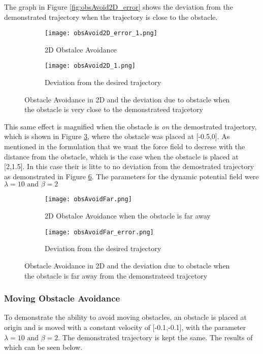 The graph in Figure \ref{fig:obsAvoid2D_error} shows the deviation from the demonstrated trajectory when the trajectory is close to the obstacle. 
\begin{figure}[!htp]
    \centering
    \begin{subfigure}{0.5\textwidth}
        \texttt{[image: obsAvoid2D\_error\_1.png]}
        \caption{2D Obstalce Avoidance}
        \label{fig:obsAvoid2D_1}
    \end{subfigure}%
    \begin{subfigure}{0.5\textwidth}
        \centering
        \texttt{[image: obsAvoid2D\_1.png]}
        \caption{Deviation from the desired trajectory}
        \label{fig:obsAvoid2D_error_1}
    \end{subfigure}
    \caption{Obstacle Avoidance in 2D and the deviation due to obstacle when the obstacle is very close to the demonstrateed trajcetory}
    \label{fig:obsAvoid2D_ontraj}
\end{figure}


This same effect is magnified when the obstacle is \textit{on} the demostrated trajectory, 
which is shown in Figure \ref{fig:obsAvoid2D_ontraj}, where
the obstacle was placed at [-0.5,0]. As mentioned in the formulation that we want the force field to decrese with the distance from the obstacle, which
is the case when the obstacle is placed at [2,1.5]. In this case their is litte to no deviation from the demostrated trajectory
as demonstrated in Figure \ref{fig:obsAvoid2Dfar}. The parameters for the dynamic potential field were $\lambda = 10 \text{ and } \beta = 2$
\begin{figure}[!htp]
    \centering
    \begin{subfigure}{0.5\textwidth}
        \texttt{[image: obsAvoidFar.png]}
        \caption{2D Obstalce Avoidance when the obstacle is far away}
        \label{fig:obsAvoid2D_far}
    \end{subfigure}%
    \begin{subfigure}{0.5\textwidth}
        \centering
        \texttt{[image: obsAvoidFar\_error.png]}
        \caption{Deviation from the desired trajectory}
        \label{fig:obsAvoid2D_error_far}
    \end{subfigure}
    \caption{Obstacle Avoidance in 2D and the deviation due to obstacle when the obstacle is far away from the demonstrateed trajcetory}
    \label{fig:obsAvoid2Dfar}
\end{figure}
\subsubsection{Moving Obstacle Avoidance} 
To demonstrate the ability to avoid moving obstacles, an obstacle is placed at origin and is moved with a constant velocity of [-0.1,-0.1],
with the parameter $\lambda = 10 \text{ and } \beta = 2$. The demonstrated trajectory is kept the same. The results of which can be seen below.

